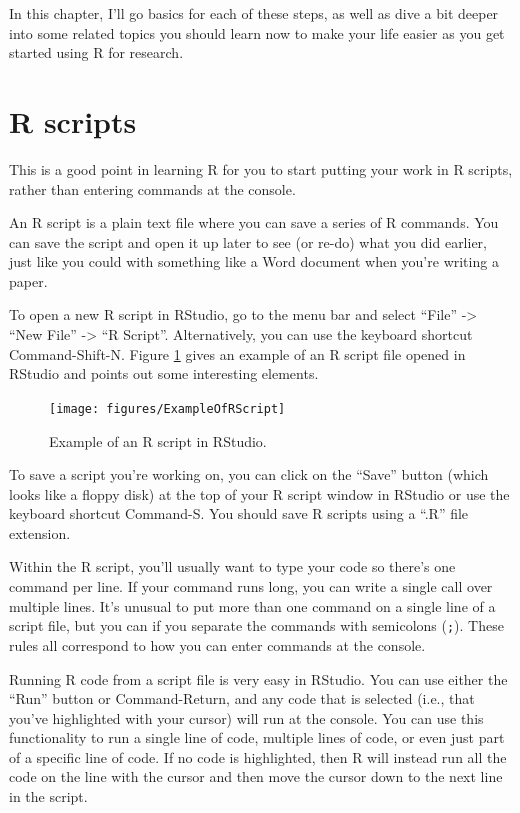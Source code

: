 \documentclass[]{book}
\begin{document}
In this chapter, I'll go basics for each of these steps, as well as dive
a bit deeper into some related topics you should learn now to make your
life easier as you get started using R for research.

\section{R scripts}\label{r-scripts}

This is a good point in learning R for you to start putting your work in
R scripts, rather than entering commands at the console.

An R script is a plain text file where you can save a series of R
commands. You can save the script and open it up later to see (or re-do)
what you did earlier, just like you could with something like a Word
document when you're writing a paper.

To open a new R script in RStudio, go to the menu bar and select
``File'' -\textgreater{} ``New File'' -\textgreater{} ``R Script''.
Alternatively, you can use the keyboard shortcut Command-Shift-N. Figure
\ref{fig:rscript} gives an example of an R script file opened in RStudio
and points out some interesting elements.

\begin{figure}

{\centering \texttt{[image: figures/ExampleOfRScript]} 

}

\caption{Example of an R script in RStudio.}\label{fig:rscript}
\end{figure}

To save a script you're working on, you can click on the ``Save'' button
(which looks like a floppy disk) at the top of your R script window in
RStudio or use the keyboard shortcut Command-S. You should save R
scripts using a ``.R'' file extension.

Within the R script, you'll usually want to type your code so there's
one command per line. If your command runs long, you can write a single
call over multiple lines. It's unusual to put more than one command on a
single line of a script file, but you can if you separate the commands
with semicolons (\texttt{;}). These rules all correspond to how you can
enter commands at the console.

Running R code from a script file is very easy in RStudio. You can use
either the ``Run'' button or Command-Return, and any code that is
selected (i.e., that you've highlighted with your cursor) will run at
the console. You can use this functionality to run a single line of
code, multiple lines of code, or even just part of a specific line of
code. If no code is highlighted, then R will instead run all the code on
the line with the cursor and then move the cursor down to the next line
in the script.
\end{document}
